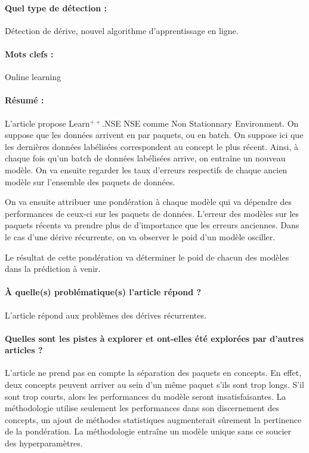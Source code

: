 \documentclass[11pt,a4paper]{report}
\begin{document}
\paragraph{Quel type de détection :} Détection de dérive, nouvel algorithme d'apprentissage en ligne.

\paragraph{Mots clefs :} Online learning

\paragraph{Résumé :} L'article propose Learn$^{++}$.NSE NSE comme Non Stationnary Environment. On suppose que les données arrivent en par paquets, ou en batch. On suppose ici que les dernières données labélisées correspondent au concept le plus récent. Ainsi, à chaque fois qu'un batch de données labélisées arrive, on entraîne un nouveau modèle. On va ensuite regarder les taux d'erreurs respectifs de chaque ancien modèle sur l'ensemble des paquets de données. 

On va ensuite attribuer une pondération à chaque modèle qui va dépendre des performances de ceux-ci sur les paquets de données. L'erreur des modèles sur les paquets récents va prendre plus de d'importance que les erreurs anciennes. Dans le cas d'une dérive récurrente, on va observer le poid d'un modèle osciller.

Le résultat de cette pondération va déterminer le poid de chacun des modèles dans la prédiction à venir.


\paragraph{À quelle(s) problématique(s) l'article répond ?} L'article répond aux problèmes des dérives récurrentes.

\paragraph{Quelles sont les pistes à explorer et ont-elles été explorées par d'autres articles ?} L'article ne prend pas en compte la séparation des paquets en concepts. En effet, deux concepts peuvent arriver au sein d'un même paquet s'ils sont trop longs. S'il sont trop courts, alors les performances du modèle seront insatisfaisantes. La méthodologie utilise seulement les performances dans son discernement des concepts, un ajout de méthodes statistiques augmenterait sûrement la pertinence de la pondération. La méthodologie entraîne un modèle unique sans ce soucier des hyperparamètres.
\end{document}
